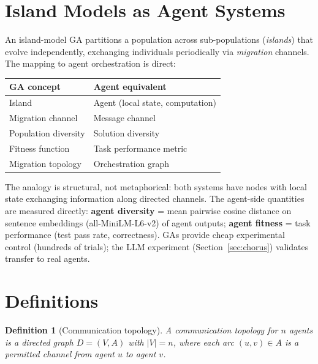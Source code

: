\documentclass[10pt,twocolumn]{article}
\newtheorem{definition}{Definition}
\begin{document}
\section{Island Models as Agent Systems}
\label{sec:analogy}

An island-model GA partitions a population across sub-populations
(\emph{islands}) that evolve independently, exchanging individuals
periodically via \emph{migration} channels. The mapping to agent
orchestration is direct:

\begin{center}
\small
\begin{tabular}{@{}p{3.2cm}p{3.8cm}@{}}
\toprule
\textbf{GA concept} & \textbf{Agent equivalent} \\
\midrule
Island & Agent (local state, computation) \\
Migration channel & Message channel \\
Population diversity & Solution diversity \\
Fitness function & Task performance metric \\
Migration topology & Orchestration graph \\
\bottomrule
\end{tabular}
\end{center}

\noindent
The analogy is structural, not metaphorical: both systems have nodes
with local state exchanging information along directed channels.
The agent-side quantities are measured directly:
\textbf{agent diversity} = mean pairwise cosine distance on sentence
embeddings (all-MiniLM-L6-v2) of agent outputs;
\textbf{agent fitness} = task performance (test pass rate,
correctness). GAs provide cheap experimental control (hundreds of
trials); the LLM experiment (Section~\ref{sec:chorus}) validates
transfer to real agents.

\section{Definitions}
\label{sec:definitions}

\begin{definition}[Communication topology]
A \emph{communication topology} for $n$ agents is a directed graph
$D = (V, A)$ with $|V| = n$, where each arc $(u, v) \in A$ is a
permitted channel from agent $u$ to agent $v$.
\end{definition}
\end{document}
